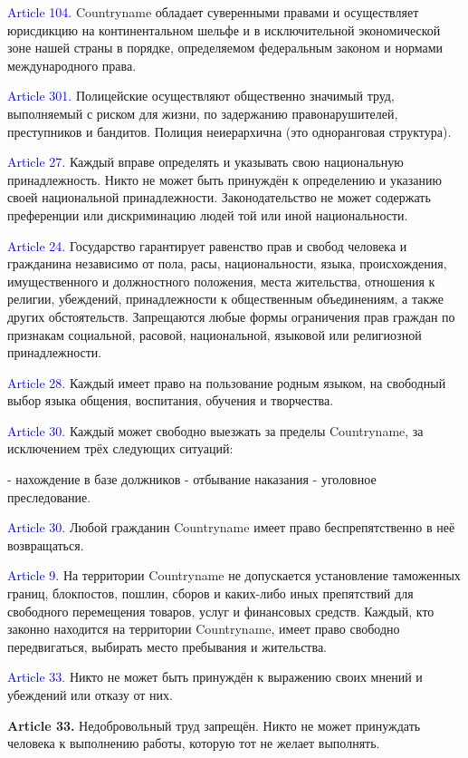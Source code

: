 \documentclass[11pt]{article}
\theoremstyle{remark}
\theoremstyle{definition}
\begin{document}
\textcolor{blue}{Article 104.} Countryname обладает суверенными правами и осуществляет юрисдикцию на континентальном шельфе и в исключительной экономической зоне нашей страны в порядке, определяемом федеральным законом и нормами международного права.

\textcolor{blue}{Article 301.} Полицейские осуществляют общественно значимый труд, выполняемый с риском для жизни, по задержанию правонарушителей, преступников и бандитов. Полиция неиерархична (это одноранговая структура).

\textcolor{blue}{Article 27.} Каждый вправе определять и указывать свою национальную принадлежность. Никто не может быть принуждён к определению и указанию своей национальной принадлежности. Законодательство не может содержать преференции или дискриминацию людей той или иной национальности.


\textcolor{blue}{Article 24.} Государство гарантирует равенство прав и свобод человека и гражданина независимо от пола, расы, национальности, языка, происхождения, имущественного и должностного положения, места жительства, отношения к религии, убеждений, принадлежности к общественным объединениям, а также других обстоятельств. Запрещаются любые формы ограничения прав граждан по признакам социальной, расовой, национальной, языковой или религиозной принадлежности.

\textcolor{blue}{Article 28.} Каждый имеет право на пользование родным языком, на свободный выбор языка общения, воспитания, обучения и творчества.


\textcolor{blue}{Article 30.} Каждый может свободно выезжать за пределы Countryname, за исключением трёх следующих ситуаций:

- нахождение в базе должников
- отбывание наказания
- уголовное преследование.


\textcolor{blue}{Article 30.} Любой гражданин Countryname имеет право беспрепятственно в неё возвращаться.

\textcolor{blue}{Article 9.} На территории Countryname не допускается установление таможенных границ, блокпостов, пошлин, сборов и каких-либо иных препятствий для свободного перемещения товаров, услуг и финансовых средств. Каждый, кто законно находится на территории Countryname, имеет право свободно передвигаться, выбирать место пребывания и жительства.


\textcolor{blue}{Article 33.} Никто не может быть принуждён к выражению своих мнений и убеждений или отказу от них.

\textbf{Article 33.} Недобровольный труд запрещён. Никто не может принуждать человека к выполнению работы, которую тот не желает выполнять.
\end{document}
